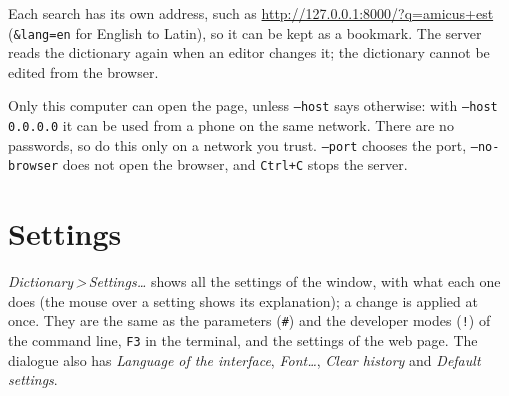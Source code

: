 \documentclass[12pt,
              article,
              oneside
              ]{memoir}
\newcommand*{\menu}[1]{\textit{#1}}
\newcommand*{\then}{\,>\,}
\newcommand*{\key}[1]{\texttt{#1}}
\begin{document}
%
Each search has its own address, such as
\url{http://127.0.0.1:8000/?q=amicus+est} (\texttt{\&lang=en} for English
to Latin), so it can be kept as a bookmark. The server reads the
dictionary again when an editor changes it; the dictionary cannot be
edited from the browser.

%
Only this computer can open the page, unless \texttt{--host} says
otherwise: with \texttt{--host 0.0.0.0} it can be used from a phone on the
same network. There are no passwords, so do this only on a network you
trust. \texttt{--port} chooses the port, \texttt{--no-browser} does not
open the browser, and \key{Ctrl+C} stops the server.

\section{Settings}
\label{sec:settings}

%
\menu{Dictionary\then Settings\ldots} shows all the settings of the
window, with what each one does (the mouse over a setting shows its
explanation); a change is applied at once. They are the same as the
parameters (\texttt{\#}) and the developer modes (\texttt{!}) of the
command line, \key{F3} in the terminal, and the settings of the web page.
The dialogue also has \menu{Language of the interface}, \menu{Font\ldots},
\menu{Clear history} and \menu{Default settings}.
\end{document}
